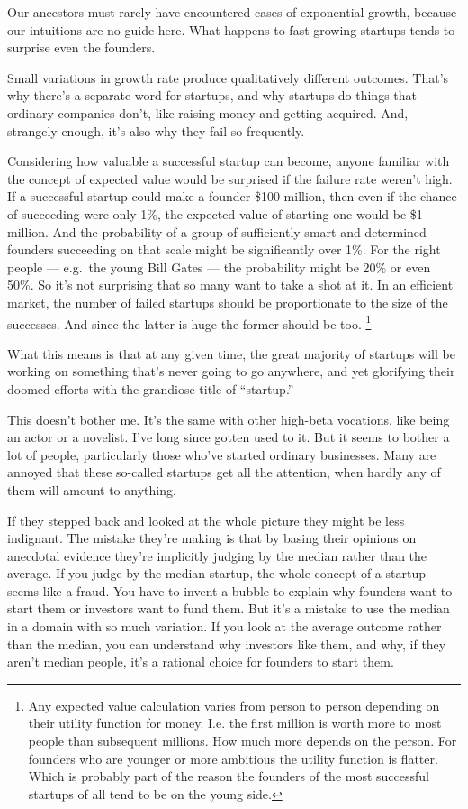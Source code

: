 \documentclass[12pt]{book}
\begin{document}
Our ancestors must rarely have encountered cases of exponential growth,
because our intuitions are no guide here. What happens to fast growing
startups tends to surprise even the founders.

Small variations in growth rate produce qualitatively different
outcomes. That's why there's a separate word for startups, and why
startups do things that ordinary companies don't, like raising money and
getting acquired. And, strangely enough, it's also why they fail so
frequently.

Considering how valuable a successful startup can become, anyone
familiar with the concept of expected value would be surprised if the
failure rate weren't high. If a successful startup could make a founder
\$100 million, then even if the chance of succeeding were only 1\%, the
expected value of starting one would be \$1 million. And the probability
of a group of sufficiently smart and determined founders succeeding on
that scale might be significantly over 1\%. For the right people ---
e.g.~the young Bill Gates --- the probability might be 20\% or even
50\%. So it's not surprising that so many want to take a shot at it. In
an efficient market, the number of failed startups should be
proportionate to the size of the successes. And since the latter is huge
the former should be too. \footnote{Any expected value calculation varies from person to person
depending on their utility function for money. I.e. the first million is
worth more to most people than subsequent millions. How much more
depends on the person. For founders who are younger or more ambitious
the utility function is flatter. Which is probably part of the reason
the founders of the most successful startups of all tend to be on the
young side.}

What this means is that at any given time, the great majority of
startups will be working on something that's never going to go anywhere,
and yet glorifying their doomed efforts with the grandiose title of
``startup.''

This doesn't bother me. It's the same with other high-beta vocations,
like being an actor or a novelist. I've long since gotten used to it.
But it seems to bother a lot of people, particularly those who've
started ordinary businesses. Many are annoyed that these so-called
startups get all the attention, when hardly any of them will amount to
anything.

If they stepped back and looked at the whole picture they might be less
indignant. The mistake they're making is that by basing their opinions
on anecdotal evidence they're implicitly judging by the median rather
than the average. If you judge by the median startup, the whole concept
of a startup seems like a fraud. You have to invent a bubble to explain
why founders want to start them or investors want to fund them. But it's
a mistake to use the median in a domain with so much variation. If you
look at the average outcome rather than the median, you can understand
why investors like them, and why, if they aren't median people, it's a
rational choice for founders to start them.
\end{document}
